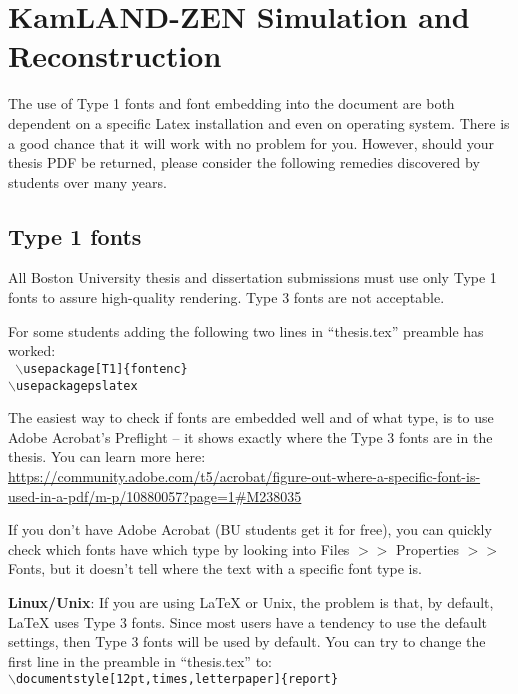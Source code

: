 \chapter{KamLAND-ZEN Simulation and Reconstruction}
\label{chapter:details}
\thispagestyle{myheadings}

\graphicspath{{3_Chapter_Details/Figures/}}

The use of Type 1 fonts and font embedding into the document are both dependent on a specific Latex installation and even on operating system. There is a good chance that it will work with no problem for you. However, should your thesis PDF be returned, please consider the following remedies discovered by students over many years. 

\section{Type 1 fonts}

All Boston University thesis and dissertation submissions must use only Type 1 fonts to assure high-quality rendering. Type 3 fonts are not acceptable.

For some students adding the following two lines in ``thesis.tex'' preamble has worked:\\
%
{\tt
$\backslash$usepackage[T1]\{fontenc\}\\
$\backslash$usepackage{pslatex}
   } 


The easiest way to check if fonts are embedded well and of what type, is to use Adobe Acrobat's Preflight -- it shows exactly where the Type 3 fonts are in the thesis. You can learn more here: \url{https://community.adobe.com/t5/acrobat/figure-out-where-a-specific-font-is-used-in-a-pdf/m-p/10880057?page=1#M238035}

If you don't have Adobe Acrobat (BU students get it for free), you can quickly check which fonts have which type by looking into Files $>>$ Properties $>>$ Fonts, but it doesn't tell where the text with a specific font type is.

{\bf Linux/Unix}: If you are using LaTeX or Unix, the problem is that, by default, LaTeX uses Type 3 fonts. Since most users have a tendency to use the default settings, then Type 3 fonts will be used by default. You can try to change the first line in the preamble in ``thesis.tex'' to:\\
%
{\tt $\backslash$documentstyle[12pt,times,letterpaper]\{report\}}

